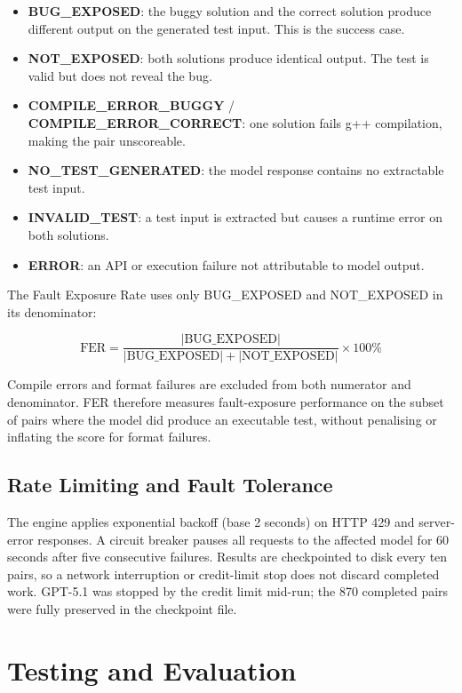 \begin{itemize}
    \item \textbf{BUG\_EXPOSED}: the buggy solution and the correct solution produce different output on the generated test input. This is the success case.
    \item \textbf{NOT\_EXPOSED}: both solutions produce identical output. The test is valid but does not reveal the bug.
    \item \textbf{COMPILE\_ERROR\_BUGGY} / \textbf{COMPILE\_ERROR\_CORRECT}: one solution fails g++ compilation, making the pair unscoreable.
    \item \textbf{NO\_TEST\_GENERATED}: the model response contains no extractable test input.
    \item \textbf{INVALID\_TEST}: a test input is extracted but causes a runtime error on both solutions.
    \item \textbf{ERROR}: an API or execution failure not attributable to model output.
\end{itemize}

The Fault Exposure Rate uses only BUG\_EXPOSED and NOT\_EXPOSED in its denominator:

\begin{equation}
    \text{FER} = \frac{|\text{BUG\_EXPOSED}|}{|\text{BUG\_EXPOSED}| + |\text{NOT\_EXPOSED}|} \times 100\%
\end{equation}

Compile errors and format failures are excluded from both numerator and denominator. FER therefore measures fault-exposure performance on the subset of pairs where the model did produce an executable test, without penalising or inflating the score for format failures.

\subsection{Rate Limiting and Fault Tolerance}

The engine applies exponential backoff (base 2 seconds) on HTTP 429 and server-error responses. A circuit breaker pauses all requests to the affected model for 60 seconds after five consecutive failures. Results are checkpointed to disk every ten pairs, so a network interruption or credit-limit stop does not discard completed work. GPT-5.1 was stopped by the credit limit mid-run; the 870 completed pairs were fully preserved in the checkpoint file.

\section{Testing and Evaluation}

